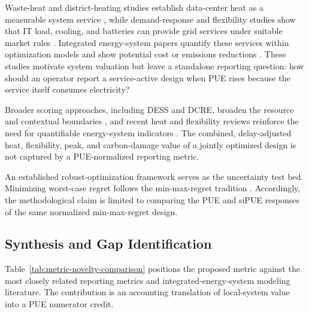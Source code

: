 \documentclass[preprint,12pt]{elsarticle}
\begin{document}
Waste-heat and district-heating studies establish data-center heat as a measurable system service \cite{11,10}, while demand-response and flexibility studies show that IT load, cooling, and batteries can provide grid services under suitable market rules \cite{Takci2025,Crozier2025}. Integrated energy-system papers quantify these services within optimization models and show potential cost or emissions reductions \cite{JerezMonsalves2023,Wang2024}. These studies motivate system valuation but leave a standalone reporting question: how should an operator report a service-active design when PUE rises because the service itself consumes electricity?

Broader scoring approaches, including DESS and DCRE, broaden the resource and contextual boundaries \cite{Terenius2023,GreenGrid2025DCRE}, and recent heat and flexibility reviews reinforce the need for quantifiable energy-system indicators \cite{Yuan2025,Takci2025}. The combined, delay-adjusted heat, flexibility, peak, and carbon-damage value of a jointly optimized design is not captured by a PUE-normalized reporting metric.

An established robust-optimization framework serves as the uncertainty test bed. Minimizing worst-case regret follows the min-max-regret tradition \cite{savage1951theory,MR-1626-RPC}. Accordingly, the methodological claim is limited to comparing the PUE and siPUE responses of the same normalized min-max-regret design.

\subsection{Synthesis and Gap Identification}

Table~\ref{tab:metric-novelty-comparison} positions the proposed metric against the most closely related reporting metrics and integrated-energy-system modeling literature. The contribution is an accounting translation of local-system value into a PUE numerator credit.
\end{document}
